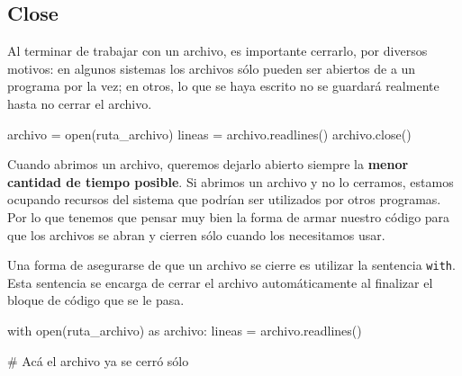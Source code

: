 \documentclass[
  letterpaper,
  DIV=11,
  numbers=noendperiod]{scrreprt}
\newenvironment{Shaded}{\begin{snugshade}}{\end{snugshade}}
\newcommand{\BuiltInTok}[1]{\textcolor[rgb]{0.00,0.23,0.31}{#1}}
\newcommand{\CommentTok}[1]{\textcolor[rgb]{0.37,0.37,0.37}{#1}}
\newcommand{\ControlFlowTok}[1]{\textcolor[rgb]{0.00,0.23,0.31}{#1}}
\newcommand{\ImportTok}[1]{\textcolor[rgb]{0.00,0.46,0.62}{#1}}
\newcommand{\NormalTok}[1]{\textcolor[rgb]{0.00,0.23,0.31}{#1}}
\newcommand{\OperatorTok}[1]{\textcolor[rgb]{0.37,0.37,0.37}{#1}}
\begin{document}
\subsection{Close}\label{close}

Al terminar de trabajar con un archivo, es importante cerrarlo, por
diversos motivos: en algunos sistemas los archivos sólo pueden ser
abiertos de a un programa por la vez; en otros, lo que se haya escrito
no se guardará realmente hasta no cerrar el archivo.

\begin{Shaded}
\begin{Highlighting}[]
\NormalTok{archivo }\OperatorTok{=} \BuiltInTok{open}\NormalTok{(ruta\_archivo)}
\NormalTok{lineas }\OperatorTok{=}\NormalTok{ archivo.readlines()}
\NormalTok{archivo.close()}
\end{Highlighting}
\end{Shaded}

\begin{tcolorbox}[enhanced jigsaw, bottomrule=.15mm, leftrule=.75mm, opacityback=0, colback=white, toprule=.15mm, bottomtitle=1mm, opacitybacktitle=0.6, rightrule=.15mm, left=2mm, arc=.35mm, coltitle=black, title=\textcolor{quarto-callout-warning-color}{\faExclamationTriangle}\hspace{0.5em}{Warning}, breakable, toptitle=1mm, colframe=quarto-callout-warning-color-frame, titlerule=0mm, colbacktitle=quarto-callout-warning-color!10!white]

Cuando abrimos un archivo, queremos dejarlo abierto siempre la
\textbf{menor cantidad de tiempo posible}. Si abrimos un archivo y no lo
cerramos, estamos ocupando recursos del sistema que podrían ser
utilizados por otros programas. Por lo que tenemos que pensar muy bien
la forma de armar nuestro código para que los archivos se abran y
cierren sólo cuando los necesitamos usar.

\end{tcolorbox}

Una forma de asegurarse de que un archivo se cierre es utilizar la
sentencia \texttt{with}. Esta sentencia se encarga de cerrar el archivo
automáticamente al finalizar el bloque de código que se le pasa.

\begin{Shaded}
\begin{Highlighting}[]
\ControlFlowTok{with} \BuiltInTok{open}\NormalTok{(ruta\_archivo) }\ImportTok{as}\NormalTok{ archivo:}
\NormalTok{  lineas }\OperatorTok{=}\NormalTok{ archivo.readlines()}

\CommentTok{\# Acá el archivo ya se cerró sólo}
\end{Highlighting}
\end{Shaded}
\end{document}

